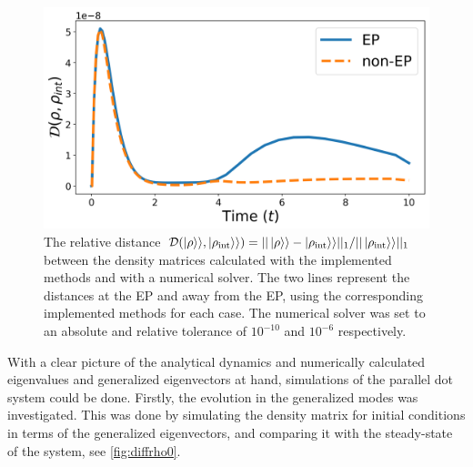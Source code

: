 \documentclass[../main.tex]{subfiles}
\begin{document}
\begin{figure}[H]
    \centering
    \includegraphics[width=0.6\linewidth]{figures/minevsint.png}
    \caption{The relative distance $\mathcal{D}(\ket{\rho}\rangle, \ket{\rho_\text{int}}\rangle) = ||\ket{\rho}\rangle - \ket{\rho_\text{int}}\rangle||_1/||\ket{\rho_\text{int}}\rangle||_1$ between the density matrices calculated with the implemented methods and with a numerical solver. The two lines represent the distances at the EP and away from the EP, using the corresponding implemented methods for each case. The numerical solver was set to an absolute and relative tolerance of $10^{-10}$ and $10^{-6}$ respectively.}
    \label{fig:minevsint}
\end{figure}

With a clear picture of the analytical dynamics and numerically calculated eigenvalues and generalized eigenvectors at hand, simulations of the parallel dot system could be done. Firstly, the evolution in the generalized modes was investigated. This was done by simulating the density matrix for initial conditions in terms of the generalized eigenvectors, and comparing it with the steady-state of the system, see \cref{fig:diffrho0}.
\end{document}
